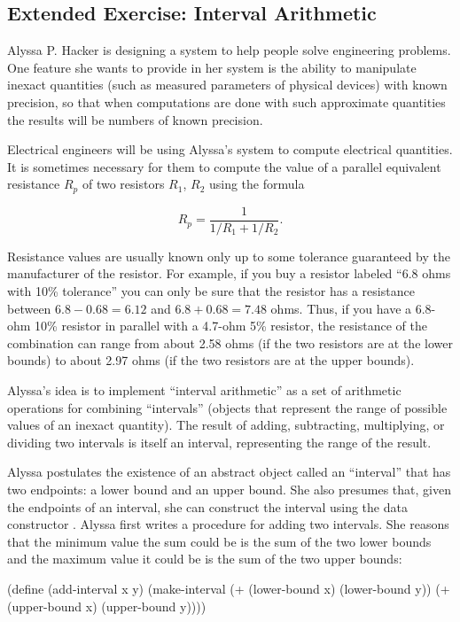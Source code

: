\subsection{Extended Exercise: Interval Arithmetic}
\label{Section 2.1.4}

Alyssa P. Hacker is designing a system to help people solve engineering
problems.  One feature she wants to provide in her system is the ability to
manipulate inexact quantities (such as measured parameters of physical devices)
with known precision, so that when computations are done with such approximate
quantities the results will be numbers of known precision.

Electrical engineers will be using Alyssa's system to compute electrical
quantities.  It is sometimes necessary for them to compute the value of a
parallel equivalent resistance \( R_p \) of two resistors \( R_1 \), \( R_2 \)
using the formula

$$ R_p = \frac{1}{1 / R_1 + 1 / R_2}.  $$

Resistance values are usually known only up to some tolerance guaranteed by the
manufacturer of the resistor.  For example, if you buy a resistor labeled ``6.8
ohms with 10\% tolerance'' you can only be sure that the resistor has a
resistance between \( 6.8 - 0.68 = 6.12 \) and \( 6.8 + 0.68 = 7.48 \) ohms.  Thus, if you
have a 6.8-ohm 10\% resistor in parallel with a 4.7-ohm 5\% resistor, the
resistance of the combination can range from about 2.58 ohms (if the two
resistors are at the lower bounds) to about 2.97 ohms (if the two resistors are
at the upper bounds).

Alyssa's idea is to implement ``interval arithmetic'' as a set of arithmetic
operations for combining ``intervals'' (objects that represent the range of
possible values of an inexact quantity).  The result of adding, subtracting,
multiplying, or dividing two intervals is itself an interval, representing the
range of the result.

Alyssa postulates the existence of an abstract object called an ``interval''
that has two endpoints: a lower bound and an upper bound.  She also presumes
that, given the endpoints of an interval, she can construct the interval using
the data constructor .  Alyssa first writes a procedure for
adding two intervals.  She reasons that the minimum value the sum could be is
the sum of the two lower bounds and the maximum value it could be is the sum of
the two upper bounds:

\begin{codeBlock}
(define (add-interval x y)
  (make-interval (+ (lower-bound x) (lower-bound y))
                 (+ (upper-bound x) (upper-bound y))))
\end{codeBlock}

